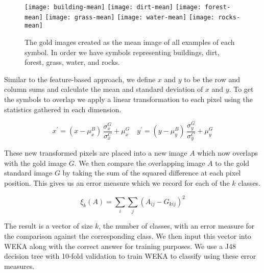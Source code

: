 
\begin{figure}[h]
\texttt{[image: building-mean]}
\texttt{[image: dirt-mean]}
\texttt{[image: forest-mean]}
\texttt{[image: grass-mean]}
\texttt{[image: water-mean]}
\texttt{[image: rocks-mean]}
\caption{The gold images created as the mean image of all examples of each symbol.
In order we have symbols representing buildings, dirt, forest, grass, water, and rocks.}
\end{figure}

Similar to the feature-based approach, we define $x$ and $y$ to be the row and column sums
and calculate the mean and standard deviation of $x$ and $y$. To get the symbols to overlap we apply a
linear transformation to each pixel using the statistics gathered in each dimension.

\begin{equation} \label{eq:gold}
x^{\prime} = (x - \mu^{B}_{x}) \, \frac{\sigma^{G}_{x}}{\sigma^{C}_{x}} + \mu^{G}_{x} \quad
y^{\prime} = (y - \mu^{B}_{y}) \, \frac{\sigma^{G}_{y}}{\sigma^{C}_{y}} + \mu^{G}_{y}
\end{equation}

These new transformed pixels are placed into a new image $A$ which now overlaps with the
gold image $G$. We then compare the overlapping image $A$ to the gold standard image $G$ by taking the sum
of the squared difference at each pixel position. This gives us an error measure which we
record for each of the $k$ classes.

\[ \xi_{k}(A) = \sum_{i}\sum_{j}{(A_{ij} - G_{kij})^{2}} \]

The result is a vector of size $k$, the number of classes, with an error measure for the
comparison against the corresponding class. We then input this vector into WEKA along
with the correct answer for training purposes. We use a J48 decision tree with 10-fold
validation to train WEKA to classify using these error measures.
